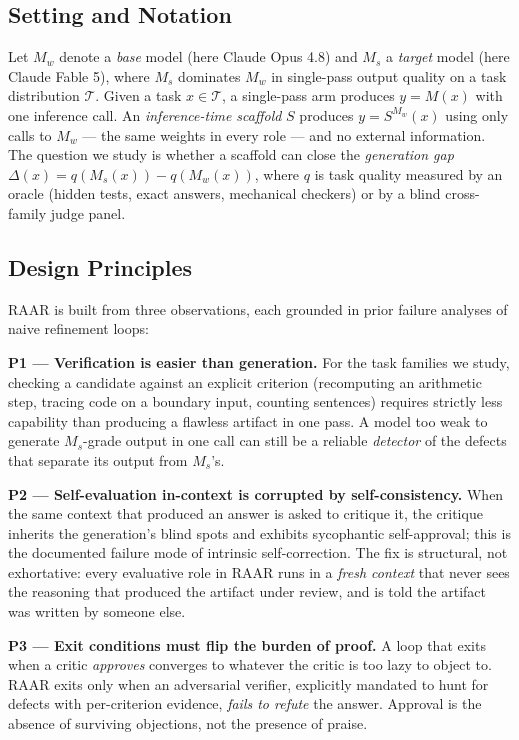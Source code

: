 \documentclass[journal]{IEEEtran}
\newcommand{\method}{RAAR}
\newcommand{\opus}{Claude Opus 4.8}
\newcommand{\fable}{Claude Fable 5}
\begin{document}
\subsection{Setting and Notation}
Let $M_w$ denote a \emph{base} model (here \opus) and $M_s$ a \emph{target}
model (here \fable), where $M_s$ dominates $M_w$ in single-pass output quality
on a task distribution $\mathcal{T}$. Given a task $x \in \mathcal{T}$, a
single-pass arm produces $y = M(x)$ with one inference call. An
\emph{inference-time scaffold} $S$ produces $y = S^{M_w}(x)$ using only calls
to $M_w$ --- the same weights in every role --- and no external information.
The question we study is whether a scaffold can close the \emph{generation
gap} $\Delta(x) = q(M_s(x)) - q(M_w(x))$, where $q$ is task quality measured
by an oracle (hidden tests, exact answers, mechanical checkers) or by a blind
cross-family judge panel.

\subsection{Design Principles}
\label{sec:principles}
\method{} is built from three observations, each grounded in prior failure
analyses of naive refinement loops:

\textbf{P1 --- Verification is easier than generation.} For the task families
we study, checking a candidate against an explicit criterion (recomputing an
arithmetic step, tracing code on a boundary input, counting sentences)
requires strictly less capability than producing a flawless artifact in one
pass. A model too weak to generate $M_s$-grade output in one call can still
be a reliable \emph{detector} of the defects that separate its output from
$M_s$'s.

\textbf{P2 --- Self-evaluation in-context is corrupted by self-consistency.}
When the same context that produced an answer is asked to critique it, the
critique inherits the generation's blind spots and exhibits sycophantic
self-approval; this is the documented failure mode of intrinsic
self-correction. The fix is structural, not exhortative: every evaluative
role in \method{} runs in a \emph{fresh context} that never sees the
reasoning that produced the artifact under review, and is told the artifact
was written by someone else.

\textbf{P3 --- Exit conditions must flip the burden of proof.} A loop that
exits when a critic \emph{approves} converges to whatever the critic is too
lazy to object to. \method{} exits only when an adversarial verifier,
explicitly mandated to hunt for defects with per-criterion evidence,
\emph{fails to refute} the answer. Approval is the absence of surviving
objections, not the presence of praise.
\end{document}
